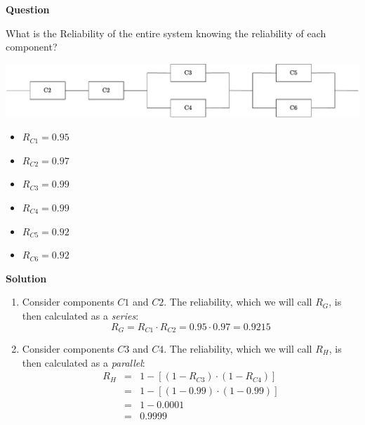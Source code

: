 \begin{examplebox}
    \begin{flushleft}
        \textcolor{Green3}{ \textbf{Question}}
    \end{flushleft}
    What is the Reliability of the entire system knowing the reliability of each component?
    \begin{center}
        \includegraphics[width=\textwidth]{img/RBD-5.pdf}
    \end{center}
    \begin{multicols}{3}
        \begin{itemize}
            \item $R_{C1} = 0.95$
            \item $R_{C2} = 0.97$
            \item $R_{C3} = 0.99$
            \item $R_{C4} = 0.99$
            \item $R_{C5} = 0.92$
            \item $R_{C6} = 0.92$
        \end{itemize}
    \end{multicols}
    \begin{flushleft}
        \textcolor{Green3}{ \textbf{Solution}}
    \end{flushleft}
    \begin{enumerate}
        \item Consider components $C1$ and $C2$. The reliability, which we will call $R_{G}$, is then calculated as a \emph{series}:
        \begin{equation*}
            R_{G} = R_{C1} \cdot R_{C2} = 0.95 \cdot 0.97 = 0.9215
        \end{equation*}

        \item Consider components $C3$ and $C4$. The reliability, which we will call $R_{H}$, is then calculated as a \emph{parallel}:
        \begin{equation*}
            \begin{array}{rcl}
                R_{H} &=& 1 - \left[\left(1-R_{C3}\right) \cdot \left(1-R_{C4}\right)\right] \\ [.5em]
                &=& 1 - \left[\left(1 - 0.99\right) \cdot \left(1 - 0.99\right)\right] \\ [.5em]
                &=& 1 - 0.0001 \\ [.5em]
                &=& 0.9999
            \end{array}
        \end{equation*}


\end{enumerate}
\end{examplebox}
